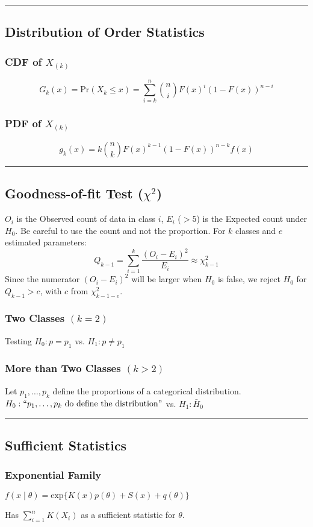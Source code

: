 \documentclass{article}
\begin{document}
\begin{multicols*}{2}
\noindent\rule{\linewidth}{0.25pt}
\subsection*{Distribution of Order Statistics}
\subsubsection*{CDF of $X_{(k)}$}
$$G_{k}(x) = \mbox{Pr}(X_{k} \leq x) = \sum_{i=k}^{n} \binom{n}{i} F(x)^{i} (1 - F(x))^{n-i}$$
\subsubsection*{PDF of $X_{(k)}$}
$$g_{k}(x) = k \binom{n}{k} F(x)^{k-1} (1 - F(x))^{n-k} f(x)$$


\noindent\rule{\linewidth}{0.25pt}
\subsection*{Goodness-of-fit Test ($\chi^{2}$)}
$O_{i}$ is the Observed count of data in class $i$, $E_{i}$ {\color{red} ($> 5$)} is the Expected count under $H_{0}$. Be careful to use the count and not the proportion. For $k$ classes and $e$ estimated parameters:
$$Q_{k-1} = \sum_{i=1}^{k} \frac{(O_{i} - E_{i})^{2}}{E_{i}} \approx \chi^{2}_{k-1}$$
Since the numerator $(O_{i} - E_{i})^{2}$ will be larger when $H_{0}$ is false, we reject $H_{0}$ for $Q_{k-1} > c$, with $c$ from $\chi^{2}_{k-1-e}$.
\subsubsection*{Two Classes $(k = 2)$}
Testing $H_{0}: p = p_{1}$ vs. $H_{1}: p \neq p_{1}$
\subsubsection*{More than Two Classes $(k > 2)$}
Let $p_{1}, \dots, p_{k}$ define the proportions of a categorical distribution. $H_{0}: ``p_{1}, \dots, p_{k} \mbox{ do define the distribution}"$ vs. $H_{1}: \bar{H}_{0}$

\noindent\rule{\linewidth}{0.25pt}
\subsection*{Sufficient Statistics}
\subsubsection*{Exponential Family}
\centerline{$f(x \mid \theta) = \mbox{exp}\{K(x)p(\theta) + S(x) + q(\theta)\}$}
Has $\sum_{i=1}^{n} K(X_{i})$ as a sufficient statistic for $\theta$.

\end{multicols*}
\end{document}
